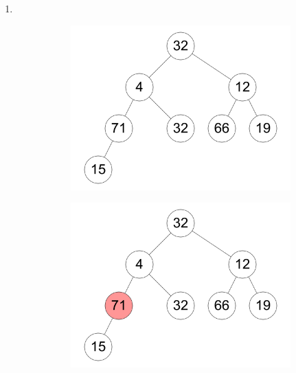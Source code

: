 \documentclass[11pt,a4paper]{article}
\begin{document}

\begin{loesung}
    \begin{enumerate}
        \item \ \\
        \begin{figure}[h!]
            \centering
            \begin{subfigure}[b]{0.23\textwidth}
                \centering
                \includegraphics[width=\textwidth]{img/a1}
            \end{subfigure}
            \begin{subfigure}[b]{0.23\textwidth}
                \centering
                \includegraphics[width=\textwidth]{img/a2}

\end{subfigure}
\end{figure}
\end{enumerate}
\end{loesung}
\end{document}
